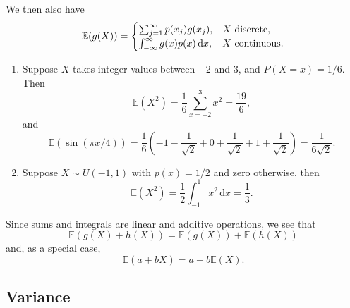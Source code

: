 \documentclass[letter-paper]{tufte-book}
\newenvironment{example}[1][Example]{\begin{trivlist}
\item[\hskip \labelsep {\bfseries #1}]}{\end{trivlist}}
\begin{document}
We then also have
\begin{equation*}
  \mathbb{E}(g(X)) =
    \begin{cases}
      \sum_{j=1}^\infty p(x_j) g(x_j), & X\ \textnormal{discrete},\\
      \int_{-\infty}^\infty g(x) p(x)\, \mathrm{d}x, & X\ \textnormal{continuous}.
    \end{cases}
\end{equation*}

\begin{example}
  \begin{enumerate}
    \item Suppose $X$ takes integer values between $-2$ and $3$, and $P(X=x) =
    1/6$. Then
    \begin{equation*}
      \mathbb{E}(X^2) = \frac{1}{6}\sum_{x=-2}^3 x^2 = \frac{19}{6},
    \end{equation*}
    and
    \begin{equation*}
      \mathbb{E}(\sin(\pi x/4)) = \frac{1}{6}\left( -1 - \frac{1}{\sqrt{2}} + 0
      + \frac{1}{\sqrt{2}} + 1 + \frac{1}{\sqrt{2}} \right) =
      \frac{1}{6\sqrt{2}}.
    \end{equation*}
    
    \item Suppose $X\sim U(-1,1)$ with $p(x) = 1/2$ and zero otherwise, then
    \begin{equation*}
      \mathbb{E}(X^2) = \frac{1}{2}\int_{-1}^1 x^2\, \mathrm{d}x = \frac{1}{3}.
    \end{equation*}
  \end{enumerate}
\end{example}

Since sums and integrals are linear and additive operations, we see that
\begin{equation*}
  \mathbb{E}(g(X) + h(X)) = \mathbb{E}(g(X)) + \mathbb{E}(h(X))
\end{equation*}
and, as a special case,
\begin{equation*}
  \mathbb{E}(a + bX) = a + b\mathbb{E}(X).
\end{equation*}


\subsection{Variance}
\end{document}
